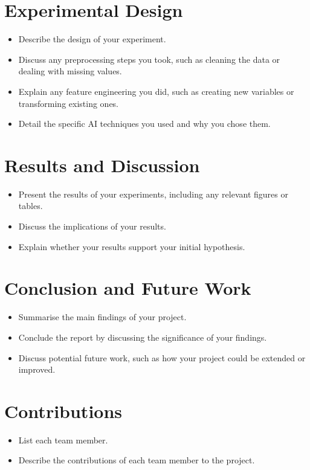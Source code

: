 \documentclass{article}
\begin{document}
\section{Experimental Design}
\begin{itemize}
    \item Describe the design of your experiment.
    \item Discuss any preprocessing steps you took, such as cleaning the data or dealing with missing values.
    \item Explain any feature engineering you did, such as creating new variables or transforming existing ones.
    \item Detail the specific AI techniques you used and why you chose them.
\end{itemize}

\section{Results and Discussion}
\begin{itemize}
    \item Present the results of your experiments, including any relevant figures or tables.
    \item Discuss the implications of your results.
    \item Explain whether your results support your initial hypothesis.
\end{itemize}

\section{Conclusion and Future Work}
\begin{itemize}
    \item Summarise the main findings of your project.
    \item Conclude the report by discussing the significance of your findings.
    \item Discuss potential future work, such as how your project could be extended or improved.
\end{itemize}

\section{Contributions}
\begin{itemize}
    \item List each team member.
    \item Describe the contributions of each team member to the project.
\end{itemize}
\end{document}
